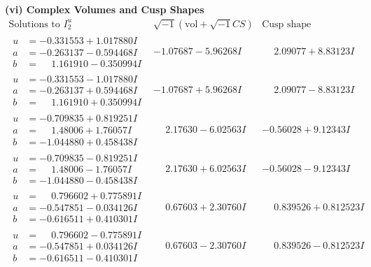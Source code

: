 \documentclass[1p]{elsarticle_modified}
\theoremstyle{definition}
\newcommand{\I}{\sqrt{-1}}
\begin{document}
\newpage\flushleft \textbf{(vi) Complex Volumes and Cusp Shapes}
$$\begin{array}{c|c|c}  
\text{Solutions to }I^u_{2}& \I (\text{vol} + \sqrt{-1}CS) & \text{Cusp shape}\\
 \hline 
\begin{aligned}
u &= -0.331553 + 1.017880 I \\
a &= -0.263137 - 0.594468 I \\
b &= \phantom{-}1.161910 - 0.350994 I\end{aligned}
 & -1.07687 - 5.96268 I & \phantom{-}2.09077 + 8.83123 I \\ \hline\begin{aligned}
u &= -0.331553 - 1.017880 I \\
a &= -0.263137 + 0.594468 I \\
b &= \phantom{-}1.161910 + 0.350994 I\end{aligned}
 & -1.07687 + 5.96268 I & \phantom{-}2.09077 - 8.83123 I \\ \hline\begin{aligned}
u &= -0.709835 + 0.819251 I \\
a &= \phantom{-}1.48006 + 1.76057 I \\
b &= -1.044880 + 0.458438 I\end{aligned}
 & \phantom{-}2.17630 - 6.02563 I & -0.56028 + 9.12343 I \\ \hline\begin{aligned}
u &= -0.709835 - 0.819251 I \\
a &= \phantom{-}1.48006 - 1.76057 I \\
b &= -1.044880 - 0.458438 I\end{aligned}
 & \phantom{-}2.17630 + 6.02563 I & -0.56028 - 9.12343 I \\ \hline\begin{aligned}
u &= \phantom{-}0.796602 + 0.775891 I \\
a &= -0.547851 - 0.034126 I \\
b &= -0.616511 + 0.410301 I\end{aligned}
 & \phantom{-}0.67603 + 2.30760 I & \phantom{-}0.839526 + 0.812523 I \\ \hline\begin{aligned}
u &= \phantom{-}0.796602 - 0.775891 I \\
a &= -0.547851 + 0.034126 I \\
b &= -0.616511 - 0.410301 I\end{aligned}
 & \phantom{-}0.67603 - 2.30760 I & \phantom{-}0.839526 - 0.812523 I \\ \hline\begin{aligned}

\end{aligned}
\end{array}$$
\end{document}
